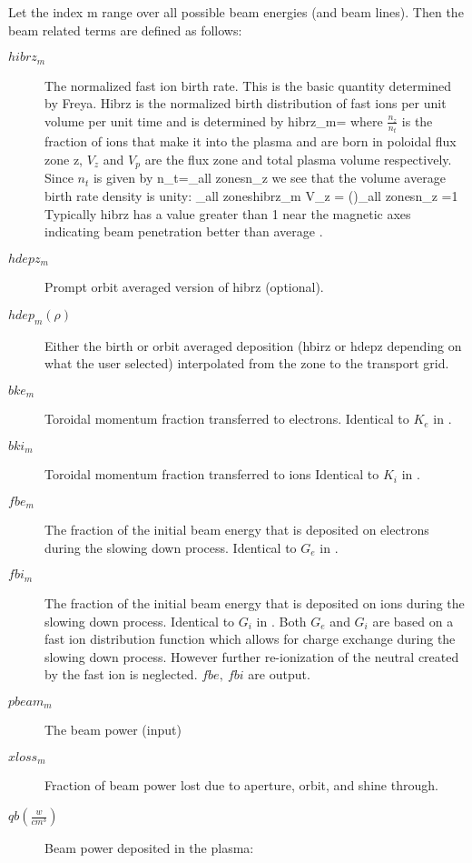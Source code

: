 Let the index m range over all possible beam energies (and beam lines).
Then the beam related terms are defined as follows:
\begin{description}
 \item[$hibrz_m$] The normalized fast ion birth rate. This is the basic quantity
 determined by Freya.  Hibrz is the  normalized birth distribution of fast ions
 per unit volume per unit time and is determined by
 \beq
  hibrz_m= 
 \eeq
 where $\frac{n_z}{n_t} $ is the fraction of ions that make it
 into the plasma and are born in poloidal flux zone z, $V_z$
 and $V_p $ are the flux zone and total plasma volume respectively.
 Since $n_t$ is given by
 \beq
  n_t=\sum_{all zones}n_z
 \eeq
 we see that the volume average birth rate density is unity:
 \beq
  \sum_{all zones}hibrz_m V_z =
  \bigg(\bigg)\sum_{all zones}n_z =1
 \eeq
 Typically hibrz has a value greater than 1 near the magnetic axes indicating
 beam penetration  better than average .
 \item[$hdepz_m$] Prompt orbit averaged version of hibrz (optional).
 \item[$hdep_m(\rho)$]  Either the birth or orbit averaged
 deposition (hbirz or hdepz depending on what the
 user selected) interpolated from the zone to the 
 transport grid.
 \item[$bke_m$] Toroidal momentum fraction transferred to electrons.
 Identical to $K_e$ in \cite{Callen74:1}.
 \item[$bki_m$] Toroidal momentum fraction transferred to ions 
 Identical to $K_i$ in \cite{Callen74:1}.
 \item[$fbe_m$] The fraction of the initial beam energy that is
 deposited on electrons during the slowing down process.
 Identical to $G_e$ in \cite{Callen74:1}.
 \item[$fbi_m$] The fraction of the initial beam energy that is deposited on
 ions during the slowing down process. Identical to $G_i$ in \cite{Callen74:1}.
 Both $G_e $ and $G_i $ are  based on a fast ion distribution function which
 allows for charge exchange during the slowing down process. However further
 re-ionization of the neutral created by the fast ion is neglected. $fbe,\ fbi$
 are output.
 \item[$pbeam_m$] The beam power (input)
 \item[$xloss_m$] Fraction of beam power lost due to aperture, orbit, and shine
 through.
 \item[$qb(\frac{w}{cm^3})$] Beam power deposited in the plasma:

\end{description}
